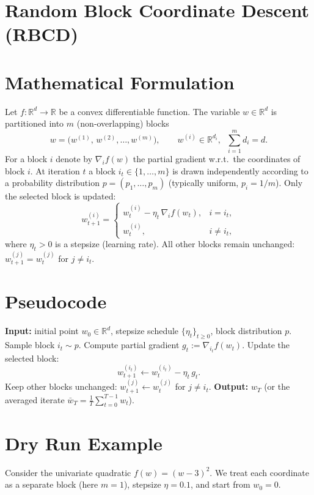 \documentclass{article}
\newcommand{\R}{\mathbb{R}}
\begin{document}
\section*{Random Block Coordinate Descent (RBCD)}

\section*{Mathematical Formulation}
Let $f:\R^{d}\rightarrow\R$ be a convex differentiable function.  
The variable $w\in\R^{d}$ is partitioned into $m$ (non‑overlapping) blocks
\[
w = \bigl(w^{(1)},\,w^{(2)},\dots ,w^{(m)}\bigr),\qquad 
w^{(i)}\in\R^{d_i},\;\;\sum_{i=1}^{m}d_i=d .
\]
For a block $i$ denote by $\nabla_i f(w)$ the partial gradient w.r.t.\ the
coordinates of block $i$.
At iteration $t$ a block $i_t\in\{1,\dots,m\}$ is drawn independently
according to a probability distribution $p=(p_1,\dots,p_m)$ (typically
uniform, $p_i=1/m$).  
Only the selected block is updated:
\[
\boxed{\;
w_{t+1}^{(i)}=
\begin{cases}
w_{t}^{(i)}-\eta_t \,\nabla_i f(w_t), & i=i_t,\\[4pt]
w_{t}^{(i)}, & i\neq i_t,
\end{cases}
\;}
\tag{1}
\]
where $\eta_t>0$ is a stepsize (learning rate).  
All other blocks remain unchanged:
$w_{t+1}^{(j)}=w_t^{(j)}$ for $j\neq i_t$.

\section*{Pseudocode}
\begin{algorithm}[H]
\caption{Random Block Coordinate Descent}
\begin{algorithmic}[1]
\State \textbf{Input:} initial point $w_0\in\R^{d}$, stepsize schedule $\{\eta_t\}_{t\ge0}$, block distribution $p$.
    \State Sample block $i_t\sim p$.
    \State Compute partial gradient $g_t:=\nabla_{i_t}f(w_t)$.
    \State Update the selected block:
          \[
          w_{t+1}^{(i_t)} \gets w_{t}^{(i_t)}-\eta_t\, g_t .
          \]
    \State Keep other blocks unchanged:
          $w_{t+1}^{(j)}\gets w_t^{(j)}$ for $j\neq i_t$.
\EndFor
\State \textbf{Output:} $w_T$ (or the averaged iterate $\bar w_T=\frac1T\sum_{t=0}^{T-1}w_t$).
\end{algorithmic}
\end{algorithm}

\section*{Dry Run Example}
Consider the univariate quadratic $f(w)=(w-3)^2$.
We treat each coordinate as a separate block (here $m=1$), stepsize $\eta=0.1$, and start from $w_0=0$.
\end{document}
